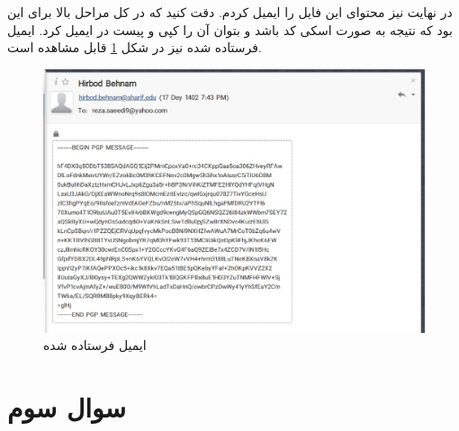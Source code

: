 \documentclass[]{article}
\begin{document}
در نهایت نیز محتوای این فایل را ایمیل کردم. دقت کنید که در کل مراحل بالا
برای این بود که نتیجه به صورت اسکی کد باشد و بتوان آن را کپی و پیست در ایمیل کرد.
ایمیل فرستاده شده نیز در شکل
\ref{fig:gpg:email}
قابل مشاهده است.
\begin{figure}[H]
    \centering
    \includegraphics[scale=0.35]{pics/gpg-email.jpg}
    \caption{ایمیل فرستاده شده}
    \label{fig:gpg:email}
\end{figure}
\section*{سوال سوم}
\end{document}
